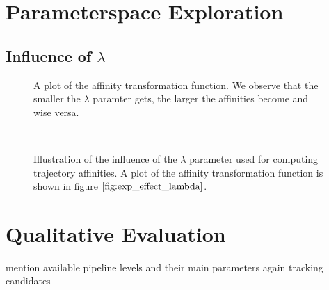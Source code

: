\section{Parameterspace Exploration}
\subsection{Influence of $\lambda$}

\begin{figure}[H]
\centering
{}
\caption[Affinity Function]{A plot of the affinity transformation function. We observe that the smaller the $\lambda$ paramter gets, the larger the affinities become and wise versa.}
\label{fig:exp_effect_lambda}
\end{figure}


\begin{figure}[H]
\begin{center}

~
\end{center}
\caption[Influence of Lambda Parameter]{Illustration of the influence of the $\lambda$ parameter used for computing trajectory affinities. A plot of the affinity transformation function is shown in figure $\ref{fig:exp_effect_lambda}$. }
\label{fig:cars_effect_of_lambda}
\end{figure}

\section{Qualitative Evaluation}
mention available pipeline levels and their main parameters again
tracking candidates

